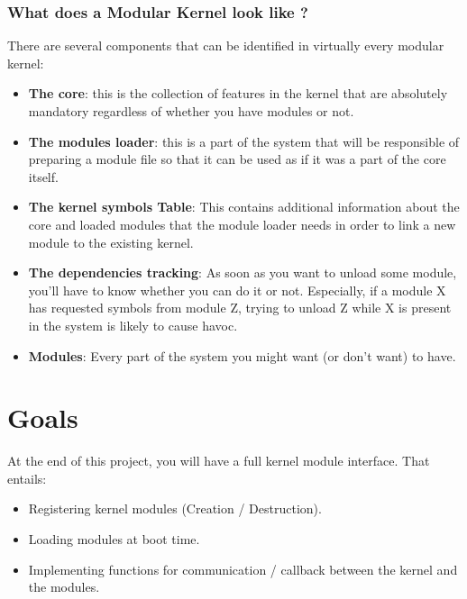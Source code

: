 \documentclass{42-en}
\begin{document}
    \subsection{ What does a Modular Kernel look like ?}
    There are several components that can be identified in virtually every
    modular kernel:
    \begin{itemize}\itemsep1pt
        \item \textbf{The core}: this is the collection of features in the
        kernel that are absolutely mandatory regardless of whether you have
        modules or not.
        \item \textbf{The modules loader}: this is a part of the system that
        will be responsible of preparing a module file so that it can be used
        as if it was a part of the core itself.
        \item \textbf{The kernel symbols Table}: This contains additional
        information about the core and loaded modules that the module loader
        needs in order to link a new module to the existing kernel.
        \item \textbf{The dependencies tracking}: As soon as you want to unload
        some module, you'll have to know whether you can do it or not.
        Especially, if a module X has requested symbols from module Z, trying
        to unload Z while X is present in the system is likely to cause havoc.
        \item \textbf{Modules}: Every part of the system you might want
        (or don't want) to have.
    \end{itemize}

\chapter{Goals}
    At the end of this project, you will have a full kernel module interface.
    That entails:
    \begin{itemize}\itemsep1pt
        \item Registering kernel modules (Creation / Destruction).
        \item Loading modules at boot time.
        \item Implementing functions for communication / callback between
        the kernel and the modules.
    \end{itemize}
\end{document}
